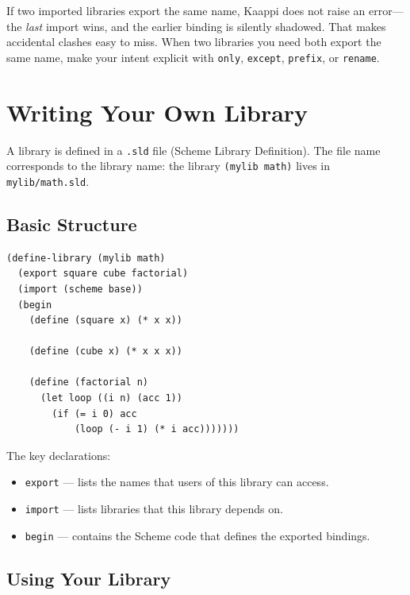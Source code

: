 \begin{warning}
If two imported libraries export the same name, Kaappi does not raise an error---the \emph{last} import wins, and the earlier binding is silently shadowed. That makes accidental clashes easy to miss. When two libraries you need both export the same name, make your intent explicit with \texttt{only}, \texttt{except}, \texttt{prefix}, or \texttt{rename}.
\end{warning}

\section{Writing Your Own Library}

A library is defined in a \texttt{.sld} file (Scheme Library Definition). The file name corresponds to the library name: the library \texttt{(mylib math)} lives in \texttt{mylib/math.sld}.

\subsection{Basic Structure}

\begin{lstlisting}
(define-library (mylib math)
  (export square cube factorial)
  (import (scheme base))
  (begin
    (define (square x) (* x x))

    (define (cube x) (* x x x))

    (define (factorial n)
      (let loop ((i n) (acc 1))
        (if (= i 0) acc
            (loop (- i 1) (* i acc)))))))
\end{lstlisting}

The key declarations:

\begin{itemize}
    \item \texttt{export} --- lists the names that users of this library can access.
    \item \texttt{import} --- lists libraries that this library depends on.
    \item \texttt{begin} --- contains the Scheme code that defines the exported bindings.
\end{itemize}

\subsection{Using Your Library}

